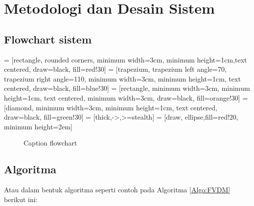 \chapter{Metodologi dan Desain Sistem}
\section{Flowchart sistem}

 = [rectangle, rounded corners, minimum width=3cm, minimum height=1cm,text centered, draw=black, fill=red!30]
 = [trapezium, trapezium left angle=70, trapezium right angle=110, minimum width=3cm, minimum height=1cm, text centered, draw=black, fill=blue!30]
 = [rectangle, minimum width=3cm, minimum height=1cm, text centered, minimum width=3cm, draw=black, fill=orange!30]
 = [diamond, minimum width=3cm, minimum height=1cm, text centered, draw=black, fill=green!30]
 = [thick,->,>=stealth]
 = [draw, ellipse,fill=red!20,
    minimum height=2em]

\begin{figure}[h!]
    \centering
    \caption{Caption flowchart}
    \label{figflow}
\end{figure}

\section{Algoritma}
 Atau dalam bentuk algoritma seperti contoh pada Algoritma \ref{Algo:FVDM} berikut ini:
 

